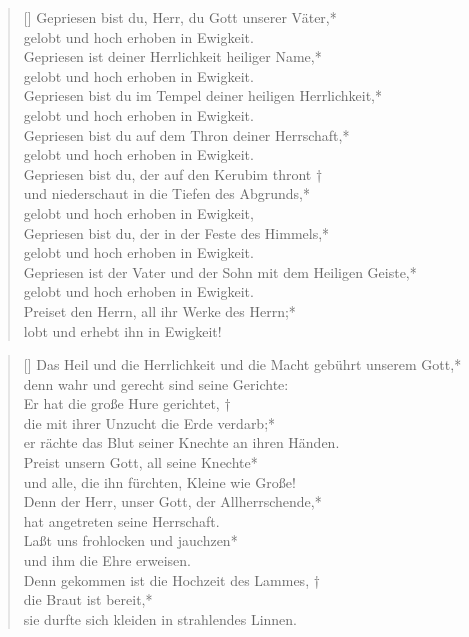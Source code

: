 \begin{verse}[\versewidth]
 Gepriesen bist du, Herr, du Gott unserer Väter,*\\
gelobt und hoch erhoben in Ewigkeit.\\
\vin Gepriesen ist deiner Herrlichkeit heiliger Name,*\\
\vin gelobt und hoch erhoben in Ewigkeit.\\
Gepriesen bist du im Tempel deiner heiligen Herrlichkeit,*\\
gelobt und hoch erhoben in Ewigkeit.\\
\vin Gepriesen bist du auf dem Thron deiner Herrschaft,*\\
\vin gelobt und hoch erhoben in Ewigkeit.\\
Gepriesen bist du, der auf den Kerubim thront †\\
und niederschaut in die Tiefen des Abgrunds,*\\
gelobt und hoch erhoben in Ewigkeit,\\
\vin Gepriesen bist du, der in der Feste des Himmels,*\\
\vin gelobt und hoch erhoben in Ewigkeit.\\
Gepriesen ist der Vater und der Sohn mit dem Heiligen Geiste,*\\
gelobt und hoch erhoben in Ewigkeit.\\

 \vin Preiset den Herrn, all ihr Werke des Herrn;*\\
 \vin lobt und erhebt ihn in Ewigkeit!\\

\end{verse}

\vspace{0.6cm}

\begin{verse}[\versewidth]
 Das Heil und die Herrlichkeit und die Macht
gebührt unserem Gott,*\\
denn wahr und gerecht sind seine Gerichte:\\
\vin Er hat die große Hure gerichtet, †\\
\vin die mit ihrer Unzucht die Erde verdarb;*\\
\vin er rächte das Blut seiner Knechte an ihren Händen.\\
Preist unsern Gott, all seine Knechte*\\
und alle, die ihn fürchten, Kleine wie Große!\\
\vin Denn der Herr, unser Gott, der Allherrschende,*\\
\vin hat angetreten seine Herrschaft.\\
Laßt uns frohlocken und jauchzen*\\
und ihm die Ehre erweisen.\\
\vin Denn gekommen ist die Hochzeit des Lammes, †\\
\vin die Braut ist bereit,*\\
\vin sie durfte sich kleiden in strahlendes Linnen.\\
\end{verse}


